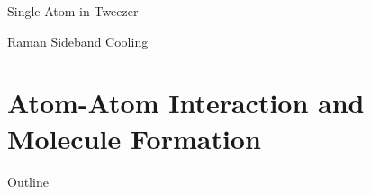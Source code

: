 \documentclass{beamer}
\begin{document}


\begin{frame}{Single Atom in Tweezer}
\end{frame}



\begin{frame}{Raman Sideband Cooling}
\end{frame}

\section{Atom-Atom Interaction and Molecule Formation}

\begin{frame}{Outline}
  \tableofcontents[currentsection]
\end{frame}



\end{document}
